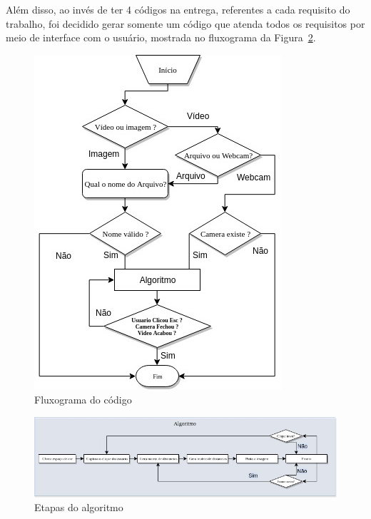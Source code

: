 \documentclass{bmvc2k}
\begin{document}
    Além disso, ao invés de ter 4 códigos na entrega, referentes a cada requisito do trabalho, foi decidido gerar somente um código que atenda todos os requisitos por meio de interface com o usuário, mostrada no fluxograma da Figura~\ref{fig:fluxograma}.
    \begin{figure}[!ht]
        \centering
        \includegraphics[scale=.55]{Figs/flowchart.jpg}
        \vspace{-3mm}
        \caption{Fluxograma do código}
        \label{fig:fluxograma}
    \end{figure}
    \begin{figure}[!ht]
        \centering
        \includegraphics[scale=.45]{Figs/algoritmo.jpg}
        \vspace{-3mm}
        \caption{Etapas do algoritmo}
        \label{fig:fluxograma}
    \end{figure}
\newpage
\end{document}
